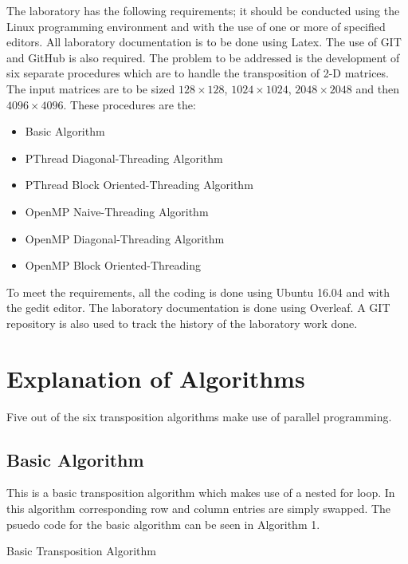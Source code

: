\documentclass[twocolumn, 11pt]{IEEEtran}
\begin{document}
The laboratory has the following requirements; it should be conducted using the Linux programming environment and with the use of one or more of specified editors. All laboratory documentation is to be done using Latex. The use of GIT and GitHub is also required. The problem to be addressed is the development of six separate procedures which are to handle the transposition of 2-D matrices. The input matrices are to be sized $128 \times 128$, $1024 \times 1024$, $2048 \times 2048$ and then $4096 \times 4096$. These procedures are the:  

\begin{itemize}

\item Basic Algorithm
\item PThread Diagonal-Threading Algorithm
\item PThread Block Oriented-Threading Algorithm
\item OpenMP Naive-Threading Algorithm 
\item OpenMP Diagonal-Threading Algorithm
\item OpenMP Block Oriented-Threading

\end{itemize}


To meet the requirements, all the coding is done using Ubuntu 16.04 and with the gedit editor. The laboratory documentation is done using Overleaf. A GIT repository is also used to track the history of the laboratory work done. 



\section{Explanation of Algorithms}

Five out of the six transposition algorithms make use of parallel programming.


\subsection{Basic Algorithm}

This is a basic transposition algorithm which makes use of a nested for loop. In this algorithm corresponding row and column entries are simply swapped. The psuedo code for the basic algorithm can be seen in Algorithm 1.   

\begin{algorithm}
\SetAlgoLined
     \caption{Basic Transposition Algorithm}
\end{algorithm}
\end{document}
